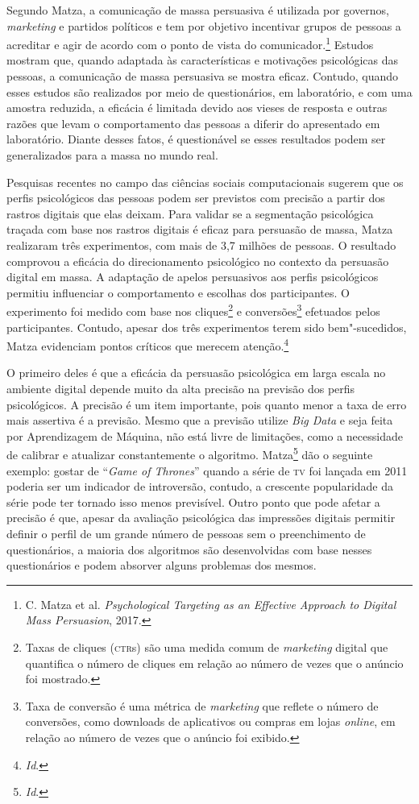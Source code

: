 Segundo Matza, a comunicação de massa persuasiva é
utilizada por governos, \emph{marketing} e partidos políticos e tem por
objetivo incentivar grupos de pessoas a acreditar e agir de acordo com o
ponto de vista do comunicador.\footnote{C. Matza et al. \emph{Psychological Targeting as an Effective Approach to Digital Mass
Persuasion}, 2017.} Estudos mostram que, quando adaptada às
características e motivações psicológicas das pessoas, a comunicação de
massa persuasiva se mostra eficaz. Contudo, quando esses estudos são
realizados por meio de questionários, em laboratório, e com uma amostra
reduzida, a eficácia é limitada devido aos vieses de resposta e outras
razões que levam o comportamento das pessoas a diferir do apresentado em
laboratório. Diante desses fatos, é questionável se esses resultados
podem ser generalizados para a massa no mundo real.

Pesquisas recentes no campo das ciências sociais computacionais sugerem
que os perfis psicológicos das pessoas podem ser previstos com precisão
a partir dos rastros digitais que elas deixam. Para validar se a
segmentação psicológica traçada com base nos rastros digitais é eficaz
para persuasão de massa, Matza realizaram três
experimentos, com mais de 3,7 milhões de pessoas. O resultado comprovou
a eficácia do direcionamento psicológico no contexto da persuasão
digital em massa. A adaptação de apelos persuasivos aos perfis
psicológicos permitiu influenciar o comportamento e escolhas dos
participantes. O experimento foi medido com base nos cliques\footnote{Taxas
  de cliques (\textsc{ctr}s) são uma medida comum de \emph{marketing} digital que
  quantifica o número de cliques em relação ao número de vezes que o
  anúncio foi mostrado.} e conversões\footnote{Taxa de conversão é uma
  métrica de \emph{marketing} que reflete o número de conversões, como
  downloads de aplicativos ou compras em lojas \emph{online}, em relação ao
  número de vezes que o anúncio foi exibido.} efetuados pelos
participantes. Contudo, apesar dos três experimentos terem sido
bem"-sucedidos, Matza evidenciam pontos críticos que merecem
atenção.\footnote{\textit{Id}.}

O primeiro deles é que a eficácia da persuasão psicológica em larga
escala no ambiente digital depende muito da alta precisão na previsão
dos perfis psicológicos. A precisão é um item importante, pois quanto
menor a taxa de erro mais assertiva é a previsão. Mesmo que a previsão
utilize \emph{Big Data} e seja feita por Aprendizagem de Máquina, não
está livre de limitações, como a necessidade de calibrar e atualizar
constantemente o algoritmo. Matza\footnote{\textit{Id}.} dão o seguinte exemplo:
gostar de ``\emph{Game of Thrones}'' quando a série de \textsc{tv} foi lançada em
2011 poderia ser um indicador de introversão, contudo, a crescente
popularidade da série pode ter tornado isso menos previsível. Outro
ponto que pode afetar a precisão é que, apesar da avaliação psicológica
das impressões digitais permitir definir o perfil de um grande número de
pessoas sem o preenchimento de questionários, a maioria dos algoritmos
são desenvolvidas com base nesses questionários e podem absorver alguns
problemas dos mesmos.

